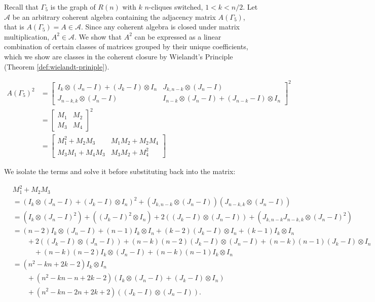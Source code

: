 Recall that $\Gamma_5$ is the graph of $R(n)$ with $k$ $n$-cliques switched, $1<k<n/2$. Let $\mathcal{A}$ be an arbitrary coherent algebra containing the adjacency matrix $A(\Gamma_5)$, that is $A(\Gamma_5)=A\in\mathcal{A}$. Since any coherent algebra is closed under matrix multiplication, $A^2\in\mathcal{A}$. We show that $A^2$ can be expressed as a linear combination of certain classes of matrices grouped by their unique coefficients, which we show are classes in the coherent closure by Wielandt's Principle (Theorem \ref{def:wielandt-priniple}).

\begin{align*}
    A(\Gamma_5)^2
    &= \begin{bmatrix}
        I_k \otimes (J_n-I) + (J_k-I) \otimes I_n & J_{k,n-k}\otimes (J_n-I) \\
        J_{n-k,k}\otimes (J_n-I) & I_{n-k} \otimes (J_n-I) + (J_{n-k}-I)\otimes I_n
    \end{bmatrix}^2\\
    &= \begin{bmatrix}
        M_1 & M_2\\
        M_3 & M_4
    \end{bmatrix}^2\\
    &= \begin{bmatrix}
        M_1^2 + M_2M_3 & M_1M_2 + M_2M_4\\
        M_3M_1 + M_4M_3 & M_3M_2 + M_4^2
    \end{bmatrix}
\end{align*}

We isolate the terms and solve it before substituting back into the matrix:

\begin{align*}
    &M_1^2 + M_2M_3\\ 
    &= (I_k \otimes (J_n-I) + (J_k-I) \otimes I_n)^2 + (J_{k,n-k}\otimes (J_n-I))(J_{n-k,k}\otimes (J_n-I))\\
    &= (I_k \otimes (J_n-I)^2) + ((J_k-I)^2 \otimes I_n) + 2((J_k-I) \otimes(J_n-I)) + (J_{k,n-k}J_{n-k,k}\otimes (J_n-I)^2)\\
    &= (n-2)I_k\otimes(J_n-I) + (n-1)I_k\otimes I_n + (k-2)(J_k-I)\otimes I_n + (k-1)I_k\otimes I_n\\
    &\quad\quad+2((J_k-I) \otimes(J_n-I)) + (n-k)(n-2)(J_k-I) \otimes (J_n-I) + (n-k)(n-1)(J_k-I) \otimes I_n\\
    &\quad\quad\quad +(n-k)(n-2)I_k\otimes(J_n-I) + (n-k)(n-1)I_k\otimes I_n\\
    &= (n^2-kn+2k-2)I_k\otimes I_n \\
    &\quad\quad +(n^2-kn-n+2k-2)(I_k\otimes(J_n-I) + (J_k-I) \otimes I_n)\\
    &\quad\quad +(n^2-kn-2n+2k+2)((J_k-I) \otimes(J_n-I)).
\end{align*}

